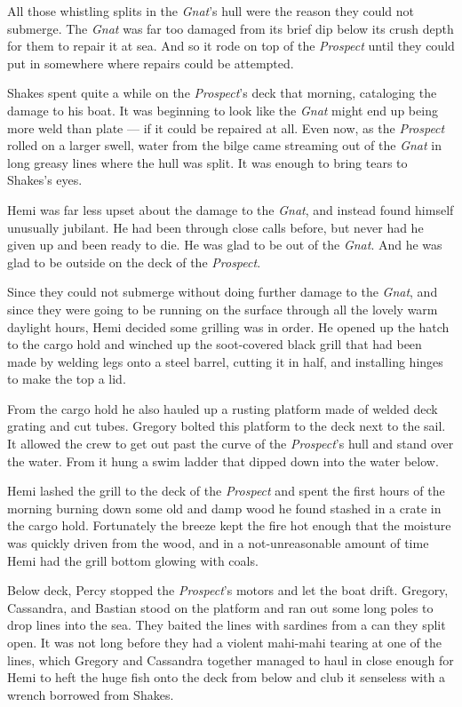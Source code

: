 \documentclass[
]{scrbook}
\begin{document}
All those whistling splits in the \emph{Gnat}'s hull were the reason
they could not submerge. The \emph{Gnat} was far too damaged from its
brief dip below its crush depth for them to repair it at sea. And so it
rode on top of the \emph{Prospect} until they could put in somewhere
where repairs could be attempted.

Shakes spent quite a while on the \emph{Prospect}'s deck that morning,
cataloging the damage to his boat. It was beginning to look like the
\emph{Gnat} might end up being more weld than plate --- if it could be
repaired at all. Even now, as the \emph{Prospect} rolled on a larger
swell, water from the bilge came streaming out of the \emph{Gnat} in
long greasy lines where the hull was split. It was enough to bring tears
to Shakes's eyes.

Hemi was far less upset about the damage to the \emph{Gnat}, and instead
found himself unusually jubilant. He had been through close calls
before, but never had he given up and been ready to die. He was glad to
be out of the \emph{Gnat}. And he was glad to be outside on the deck of
the \emph{Prospect}.

Since they could not submerge without doing further damage to the
\emph{Gnat}, and since they were going to be running on the surface
through all the lovely warm daylight hours, Hemi decided some grilling
was in order. He opened up the hatch to the cargo hold and winched up
the soot-covered black grill that had been made by welding legs onto a
steel barrel, cutting it in half, and installing hinges to make the top
a lid.

From the cargo hold he also hauled up a rusting platform made of welded
deck grating and cut tubes. Gregory bolted this platform to the deck
next to the sail. It allowed the crew to get out past the curve of the
\emph{Prospect}'s hull and stand over the water. From it hung a swim
ladder that dipped down into the water below.

Hemi lashed the grill to the deck of the \emph{Prospect} and spent the
first hours of the morning burning down some old and damp wood he found
stashed in a crate in the cargo hold. Fortunately the breeze kept the
fire hot enough that the moisture was quickly driven from the wood, and
in a not-unreasonable amount of time Hemi had the grill bottom glowing
with coals.

Below deck, Percy stopped the \emph{Prospect}'s motors and let the boat
drift. Gregory, Cassandra, and Bastian stood on the platform and ran out
some long poles to drop lines into the sea. They baited the lines with
sardines from a can they split open. It was not long before they had a
violent mahi-mahi tearing at one of the lines, which Gregory and
Cassandra together managed to haul in close enough for Hemi to heft the
huge fish onto the deck from below and club it senseless with a wrench
borrowed from Shakes.
\end{document}
